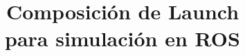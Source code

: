 \documentclass[conference]{IEEEtran}
\begin{document}
\title{Composición de Launch\\para simulación en ROS}


\maketitle












\clearpage


\end{document}
